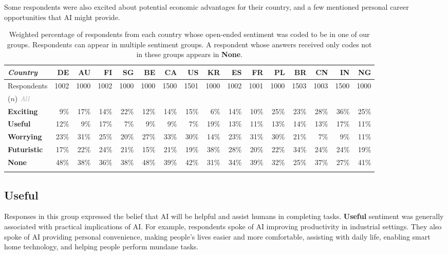 \documentclass[11pt]{article} %
\newcommand\graynew[1]{\textcolor{darkgray}{#1}}
\def\Exciting/{{\fontfamily{lmss}\selectfont\textbf{Exciting}}}  \def\Useful/{{\fontfamily{lmss}\selectfont\textbf{Useful}}}
\def\Worrying/{{\fontfamily{lmss}\selectfont\textbf{Worrying}}}
\def\Futuristic/{{\fontfamily{lmss}\selectfont\textbf{Futuristic}}}
\def\None/{{\fontfamily{lmss}\selectfont\textbf{None}}}
\begin{document}
Some respondents were also excited about potential economic advantages for their country, and a few mentioned personal career opportunities that AI might provide.


\begin{table}[t]\centering
\footnotesize
\begin{tabular}{@{}l@{\hskip 0.3cm}rrrrrrrrrrrrrrr@{}}

\emph{Country} & \bf DE & \bf AU & \bf FI & \bf SG & \bf BE & \bf CA & \bf US & \bf KR & \bf ES & \bf FR & \bf PL & \bf BR & \bf CN & \bf IN & \bf NG \\

\midrule
Respondents  & 1002 & 1000 & 1002 & 1000 & 1000 & 1500 & 1501 & 1000 & 1002 & 1001 & 1000 & 1503 & 1003 & 1500 & 1000 \\
($n$) \graynew{\emph{All}} \\
\midrule
\Exciting/ &     9\% & 17\% & 14\% & 22\% & 12\% & 14\% & 15\% &  6\% & 14\% & 10\% & 25\% & 23\% & 28\% & 36\% & 25\% \\
\Useful/ &      12\% &  9\% & 17\% &  7\% &  9\% &  9\% &  7\% & 19\% & 13\% & 11\% & 13\% & 14\% & 13\% & 17\% & 11\% \\
\Worrying/ &    23\% & 31\% & 25\% & 20\% & 27\% & 33\% & 30\% & 14\% & 23\% & 31\% & 30\% & 21\% &  7\% & 9\% &  11\% \\
\Futuristic/ &  17\% & 22\% & 24\% & 21\% & 15\% & 21\% & 19\% & 38\% & 28\% & 20\% & 22\% & 34\% & 24\% & 24\% & 19\% \\
\None/ &        48\% & 38\% & 36\% & 38\% & 48\% & 39\% & 42\% & 31\% & 34\% & 39\% & 32\% & 25\% & 37\% & 27\% & 41\% \\

\bottomrule
\vspace{0.01cm}

\end{tabular}
\caption{Weighted percentage of respondents from each country whose open-ended sentiment was coded to be in one of our groups. Respondents can appear in multiple sentiment groups. A respondent whose answers received only codes not in these groups appears in \None/.}
\label{tab:sentimentgroups}

\end{table}



\subsection{Useful}
Responses in this group expressed the belief that AI will be helpful and assist humans in completing tasks. \Useful/ sentiment was generally associated with practical implications of AI. For example, respondents spoke of AI improving productivity in industrial settings. They also spoke of AI providing personal convenience, making people's lives easier and more comfortable, assisting with daily life, enabling smart home technology, and helping people perform mundane tasks.
\end{document}
